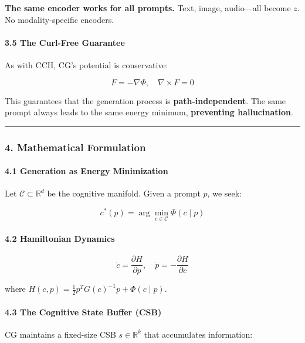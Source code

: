 \documentclass[
  11pt,
  a4paper,
]{article}
\begin{document}
\textbf{The same encoder works for all prompts.} Text, image,
audio---all become \(z\). No modality-specific encoders.

\paragraph{3.5 The Curl-Free Guarantee}\label{the-curl-free-guarantee}

As with CCH, CG's potential is conservative:

\[
F = -\nabla\Phi, \quad \nabla \times F = 0
\]

This guarantees that the generation process is
\textbf{path-independent}. The same prompt always leads to the same
energy minimum, \textbf{preventing hallucination}.

\begin{center}\rule{0.5\linewidth}{0.5pt}\end{center}

\subsubsection{4. Mathematical
Formulation}\label{mathematical-formulation-1}

\paragraph{4.1 Generation as Energy
Minimization}\label{generation-as-energy-minimization-1}

Let \(\mathcal{C} \subset \mathbb{R}^d\) be the cognitive manifold.
Given a prompt \(p\), we seek:

\[
c^*(p) = \arg\min_{c \in \mathcal{C}} \Phi(c \mid p)
\]

\paragraph{4.2 Hamiltonian Dynamics}\label{hamiltonian-dynamics}

\[
\dot{c} = \frac{\partial H}{\partial p}, \quad \dot{p} = -\frac{\partial H}{\partial c}
\]

where \(H(c, p) = \frac{1}{2} p^T G(c)^{-1} p + \Phi(c \mid p)\).

\paragraph{4.3 The Cognitive State Buffer
(CSB)}\label{the-cognitive-state-buffer-csb}

CG maintains a fixed-size CSB \(s \in \mathbb{R}^k\) that accumulates
information:
\end{document}
